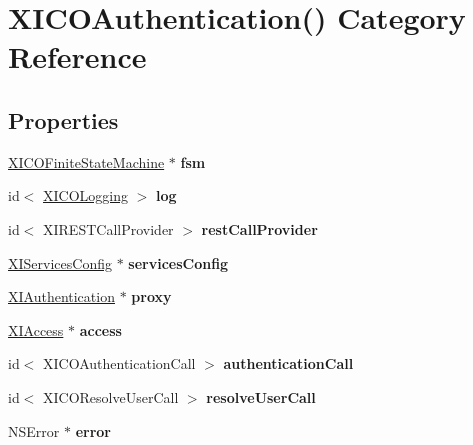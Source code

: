\hypertarget{category_x_i_c_o_authentication_07_08}{}\section{X\+I\+C\+O\+Authentication() Category Reference}
\label{category_x_i_c_o_authentication_07_08}
\subsection*{Properties}
\begin{DoxyCompactItemize}
\item 
\hypertarget{category_x_i_c_o_authentication_07_08_a48c344423dbc5d52b98bfa5d80190e86}{}\label{category_x_i_c_o_authentication_07_08_a48c344423dbc5d52b98bfa5d80190e86} 
\hyperlink{class_x_i_c_o_finite_state_machine}{X\+I\+C\+O\+Finite\+State\+Machine} $\ast$ {\bfseries fsm}
\item 
\hypertarget{category_x_i_c_o_authentication_07_08_ac8e8fec6e04fc260608cf56e34aa401e}{}\label{category_x_i_c_o_authentication_07_08_ac8e8fec6e04fc260608cf56e34aa401e} 
id$<$ \hyperlink{protocol_x_i_c_o_logging-p}{X\+I\+C\+O\+Logging} $>$ {\bfseries log}
\item 
\hypertarget{category_x_i_c_o_authentication_07_08_ad94ff8f41a2447eb0a97f6daf794ed68}{}\label{category_x_i_c_o_authentication_07_08_ad94ff8f41a2447eb0a97f6daf794ed68} 
id$<$ X\+I\+R\+E\+S\+T\+Call\+Provider $>$ {\bfseries rest\+Call\+Provider}
\item 
\hypertarget{category_x_i_c_o_authentication_07_08_ac3efe5826bc90c8affc9431b08ffcbe8}{}\label{category_x_i_c_o_authentication_07_08_ac3efe5826bc90c8affc9431b08ffcbe8} 
\hyperlink{interface_x_i_services_config}{X\+I\+Services\+Config} $\ast$ {\bfseries services\+Config}
\item 
\hypertarget{category_x_i_c_o_authentication_07_08_a3c07cf1cf6309ae91f1785bef48283c8}{}\label{category_x_i_c_o_authentication_07_08_a3c07cf1cf6309ae91f1785bef48283c8} 
\hyperlink{class_x_i_authentication}{X\+I\+Authentication} $\ast$ {\bfseries proxy}
\item 
\hypertarget{category_x_i_c_o_authentication_07_08_a1518b362e52a1027bf92151574db23a5}{}\label{category_x_i_c_o_authentication_07_08_a1518b362e52a1027bf92151574db23a5} 
\hyperlink{class_x_i_access}{X\+I\+Access} $\ast$ {\bfseries access}
\item 
\hypertarget{category_x_i_c_o_authentication_07_08_a4daee4cf799119aa1755f8d7bbc407d9}{}\label{category_x_i_c_o_authentication_07_08_a4daee4cf799119aa1755f8d7bbc407d9} 
id$<$ X\+I\+C\+O\+Authentication\+Call $>$ {\bfseries authentication\+Call}
\item 
\hypertarget{category_x_i_c_o_authentication_07_08_aa44b0fd066b877041370aa75a0f8af99}{}\label{category_x_i_c_o_authentication_07_08_aa44b0fd066b877041370aa75a0f8af99} 
id$<$ X\+I\+C\+O\+Resolve\+User\+Call $>$ {\bfseries resolve\+User\+Call}
\item 
\hypertarget{category_x_i_c_o_authentication_07_08_a66c4ad2199e56322d64869e4edfb3585}{}\label{category_x_i_c_o_authentication_07_08_a66c4ad2199e56322d64869e4edfb3585} 
N\+S\+Error $\ast$ {\bfseries error}
\end{DoxyCompactItemize}


